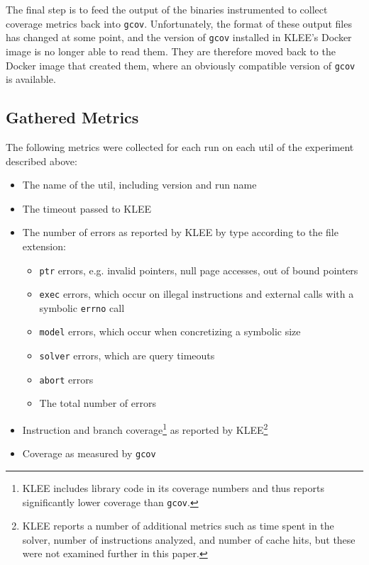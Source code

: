 \documentclass{article}
\begin{document}
The final step is to feed the output of the binaries instrumented to collect coverage metrics back into \lstinline{gcov}. Unfortunately, the format of these output files has changed at some point, and the version of \lstinline{gcov} installed in KLEE's Docker image is no longer able to read them. They are therefore moved back to the Docker image that created them, where an obviously compatible version of \lstinline{gcov} is available.

\subsection{Gathered Metrics}

The following metrics were collected for each run on each util of the experiment described above:

\begin{itemize}
    \item The name of the util, including version and run name
    \item The timeout passed to KLEE
    \item The number of errors as reported by KLEE by type according to the file extension:
          \begin{itemize}
              \item \lstinline{ptr} errors, e.g. invalid pointers, null page accesses, out of bound pointers
              \item \lstinline{exec} errors, which occur on illegal instructions and external calls with a symbolic \lstinline{errno} call
              \item \lstinline{model} errors, which occur when concretizing a symbolic size
              \item \lstinline{solver} errors, which are query timeouts
              \item \lstinline{abort} errors
              \item The total number of errors
          \end{itemize}
    \item Instruction and branch coverage\footnote{KLEE includes library code in its coverage numbers and thus reports significantly lower coverage than \lstinline{gcov}.} as reported by KLEE\footnote{KLEE reports a number of additional metrics such as time spent in the solver, number of instructions analyzed, and number of cache hits, but these were not examined further in this paper.}
    \item Coverage as measured by \lstinline{gcov}
\end{itemize}
\end{document}
